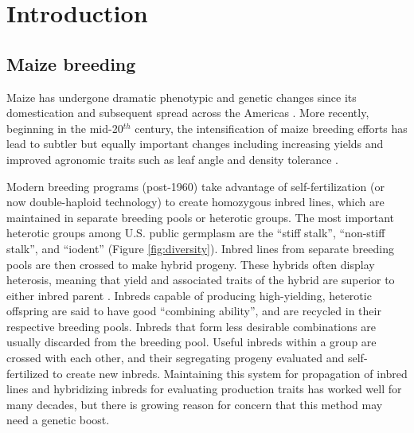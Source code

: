 \documentclass[12pt]{article}
\begin{document}
\section*{Introduction}
\label{sec:introduction}


\subsection*{Maize breeding}
Maize has undergone dramatic phenotypic and genetic changes since its domestication and subsequent spread across the Americas \citep{daFonseca:2015ey,Doebley:2004ce}. More recently, beginning in the mid-20$^{th}$ century, the intensification of maize breeding efforts has lead to subtler but equally important changes including increasing yields and improved agronomic traits such as leaf angle and density tolerance \citep{duvick2005contribution}. 

Modern breeding programs (post-1960) take advantage of self-fertilization (or now double-haploid technology) to create homozygous inbred lines, which are maintained in separate breeding pools or heterotic groups.
The most important heterotic groups among U.S. public germplasm are the ``stiff stalk'', ``non-stiff stalk'', and ``iodent'' (Figure \ref{fig:diversity}).
Inbred lines from separate breeding pools are then crossed to make hybrid progeny.  
These hybrids often display heterosis, meaning that yield and associated traits of the hybrid are superior to  either inbred parent \citep{Springer:2007bj}.  
Inbreds capable of producing high-yielding, heterotic offspring are said to have good ``combining ability'', and are recycled in their respective breeding pools.
Inbreds that form less desirable combinations are usually discarded from the breeding pool. 
Useful inbreds within a group are crossed with each other, and their segregating progeny evaluated and self-fertilized to create new inbreds. 
Maintaining this system for propagation of inbred lines and hybridizing inbreds for evaluating production traits has worked well for many decades, but there is growing reason for concern that this method may need a genetic boost. 
\end{document}
